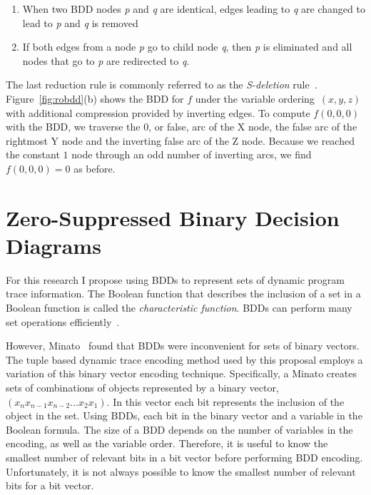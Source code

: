 \documentclass[defaultstyle,11pt]{thesis}
\begin{document}
\begin{enumerate}

\item When two BDD nodes \textit{p} and \textit{q} are identical, edges
  leading to \textit{q} are changed to lead to \textit{p} and \textit{q} is
  removed

\item If both edges from a node \textit{p} go to 
  child node \textit {q}, then \textit{p} is eliminated and all nodes that
  go to \textit{p} are redirected to \textit{q}.

\end{enumerate}

The last reduction rule is commonly referred to as the
\emph{S-deletion}
rule~\cite{minato:01:STTT}. Figure~\ref{fig:robdd}(b) shows the BDD
for $f$ under the variable ordering~$(x,y,z)$ with additional
compression provided by inverting edges. To compute $f(0,0,0)$ with
the BDD, we traverse the $0$, or false, arc of the X node, the false
arc of the rightmost Y node and the inverting false arc of the Z node.
Because we reached the constant $1$ node through an odd number of
inverting arcs, we find $f(0,0,0)=0$ as before.

\section{Zero-Suppressed Binary Decision Diagrams}

For this research I propose using BDDs to represent sets of dynamic
program trace information.  The Boolean function that describes the
inclusion of a set in a Boolean function is called the
\textit{characteristic function}. BDDs can perform many set operations
efficiently~\cite{bryant:86:ieeetc}.  

However, Minato~\cite{minato:93:dac} found that BDDs were inconvenient
for sets of binary vectors.  The tuple based dynamic trace encoding
method used by this proposal employs a variation of this binary vector
encoding technique.  Specifically, a Minato creates sets of
combinations of objects represented by a binary vector,
$(x_{n}x_{n-1}x_{n-2}...x_{2}x_{1})$.  In this vector each bit
represents the inclusion of the object in the set.  Using BDDs, each
bit in the binary vector and a variable in the Boolean formula.  The
size of a BDD depends on the number of variables in the encoding, as
well as the variable order.  Therefore, it is useful to know the
smallest number of relevant bits in a bit vector before performing BDD
encoding.  Unfortunately, it is not always possible to know the
smallest number of relevant bits for a bit vector.
\end{document}
